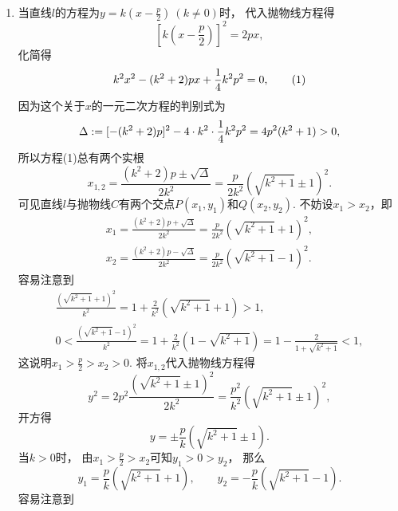 \begin{enumerate}
\begin{enumerate}
		\item 当直线\(l\)的方程为\(y=k\left(x-\frac{p}{2}\right)\ (k\neq0)\)时，
		代入抛物线方程得\begin{equation*}
			\left[k \left(x-\frac{p}{2}\right)\right]^2 = 2px,
		\end{equation*}
		化简得\begin{gather}
			k^2 x^2 - (k^2 + 2)px + \frac{1}{4} k^2 p^2 = 0, \tag1
		\end{gather}
		因为这个关于\(x\)的一元二次方程的判别式为\begin{equation*}
			\Delta
			:= [- (k^2 + 2)p]^2 - 4 \cdot k^2 \cdot \frac{1}{4} k^2 p^2
			= 4 p^2 (k^2 + 1)
			> 0,
		\end{equation*}
		所以方程(1)总有两个实根\begin{equation*}
			x_{1,2} = \frac{(k^2+2)p \pm \sqrt\Delta}{2 k^2}
			= \frac{p}{2 k^2} (\sqrt{k^2+1} \pm 1)^2.
		\end{equation*}
		可见直线\(l\)与抛物线\(C\)有两个交点\(P(x_1,y_1)\)和\(Q(x_2,y_2)\).
		不妨设\(x_1 > x_2\)，即\begin{gather*}
			x_1 = \frac{(k^2+2)p + \sqrt\Delta}{2 k^2}
			= \frac{p}{2 k^2} (\sqrt{k^2+1} + 1)^2, \\
			x_2 = \frac{(k^2+2)p - \sqrt\Delta}{2 k^2}
			= \frac{p}{2 k^2} (\sqrt{k^2+1} - 1)^2.
		\end{gather*}
		容易注意到\begin{gather*}
			\frac{(\sqrt{k^2+1}+1)^2}{k^2}
			= 1 + \frac2{k^2} (\sqrt{k^2+1} + 1)
			> 1, \\
			0 < \frac{(\sqrt{k^2+1}-1)^2}{k^2}
			= 1 + \frac2{k^2} (1 - \sqrt{k^2+1})
			= 1 - \frac2{1+\sqrt{k^2+1}}
			< 1,
		\end{gather*}
		这说明\(x_1 > \frac{p}{2} > x_2 > 0\).
		将\(x_{1,2}\)代入抛物线方程得\begin{equation*}
			y^2 = 2 p^2 \frac{(\sqrt{k^2+1}\pm1)^2}{2 k^2}
			= \frac{p^2}{k^2} (\sqrt{k^2+1}\pm1)^2,
		\end{equation*}
		开方得\begin{equation*}
			y = \pm \frac{p}{k} (\sqrt{k^2+1}\pm1).
		\end{equation*}
		当\(k>0\)时，
		由\(x_1 > \frac{p}{2} > x_2\)可知\(y_1 > 0 > y_2\)，
		那么\begin{equation*}
			y_1 = \frac{p}{k} (\sqrt{k^2+1}+1),
			\qquad
			y_2 = -\frac{p}{k} (\sqrt{k^2+1}-1).
		\end{equation*}
		容易注意到\begin{equation}

\end{equation}
\end{enumerate}
\end{enumerate}
